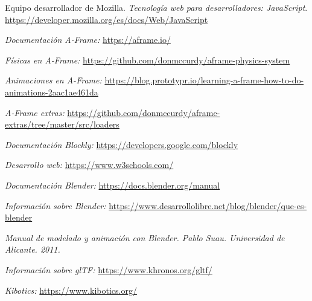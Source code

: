 \begin{thebibliography}{99}
    Equipo desarrollador de Mozilla.
    \textit{Tecnología web para desarrolladores: JavaScript}.
    \url{https://developer.mozilla.org/es/docs/Web/JavaScript}

    \textit{Documentación A-Frame:}
    \url{https://aframe.io/}
    
    \textit{Físicas en A-Frame: }
    \url{https://github.com/donmccurdy/aframe-physics-system}
    
    \textit{Animaciones en A-Frame: }
    \url{https://blog.prototypr.io/learning-a-frame-how-to-do-animations-2aac1ae461da}
    
    \textit{A-Frame extras: }
    \url{https://github.com/donmccurdy/aframe-extras/tree/master/src/loaders}
    
    \textit{Documentación Blockly: }
    \url{https://developers.google.com/blockly}
    
    \textit{Desarrollo web: }
    \url{https://www.w3schools.com/}
    
    \textit{Documentación Blender: }
    \url{https://docs.blender.org/manual}
    
    \textit{Información sobre Blender: }
    \url{https://www.desarrollolibre.net/blog/blender/que-es-blender}
    
    \textit{Manual de modelado y animación con Blender. Pablo Suau. Universidad de Alicante. 2011.}
    
    \textit{Información sobre glTF: }
    \url{https://www.khronos.org/gltf/}
   
    \textit{Kibotics:}  
    \url{https://www.kibotics.org/}

\end{thebibliography}